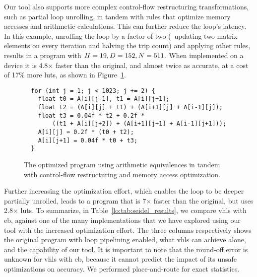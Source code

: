 Our tool also supports more complex control-flow restructuring transformations,
such as partial loop unrolling, in tandem with rules that optimize memory
accesses and arithmetic calculations.  This can further reduce the loop's
latency.  In this example, unrolling the loop by a factor of two (\ie~updating
two matrix elements on every iteration and halving the trip count) and applying
other rules, results in a program with $\mathit{II} = 19, D = 152, N = 511$.  When
implemented on a device it is 4.8$\times$ faster than the original, and
almost twice as accurate, at a cost of 17\% more \glspl{lut}, as shown in
Figure~\ref{lo:fig:seidel_prog_3}.

\begin{figure}[ht]
\begin{lstlisting}
  for (int j = 1; j < 1023; j += 2) {
    float t0 = A[i][j-1], t1 = A[i][j+1];
    float t2 = (A[i][j] + t1) + (A[i+1][j] + A[i-1][j]);
    float t3 = 0.04f * t2 + 0.2f *
        ((t1 + A[i][j+2]) + (A[i+1][j+1] + A[i-1][j+1]));
    A[i][j] = 0.2f * (t0 + t2);
    A[i][j+1] = 0.04f * t0 + t3;
  }
\end{lstlisting}
    \caption{The optimized program using arithmetic equivalences in tandem with
    control-flow restructuring and memory access optimization.}
    \label{lo:fig:seidel_prog_3}
\end{figure}

Further increasing the optimization effort, which enables the loop to be
deeper partially unrolled, leads to a program that is 7$\times$ faster
than the original, but uses 2.8$\times$ \glspl{lut}.  To summarize, in
Table~\ref{lo:tab:seidel_results}, we compare \gls{vhls} with \gls{eb}, against
one of the many implementations that we have explored using our tool with
the increased optimization effort.  The three columns respectively shows the
original program with loop pipelining enabled, what \gls{vhls} can achieve
alone, and the capability of our tool.  It is important to note that the
round-off error is unknown for \gls{vhls} with \gls{eb}, because it cannot
predict the impact of its unsafe optimizations on accuracy.  We performed
place-and-route for exact statistics.


